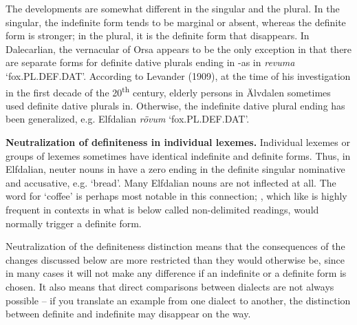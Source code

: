 
The developments are somewhat different in the singular and the plural. In the singular, the indefinite form tends to be marginal or absent, whereas the definite form is stronger; in the plural, it is the definite form that disappears. In Dalecarlian,  the vernacular of Orsa appears to be the only exception in that there are separate forms for definite dative plurals ending in \nobreakdash-as in \textit{revuma} ‘fox.PL.DEF.DAT’. According to Levander\textsc{ (1909)}, at the time of his investigation in the first decade of the 20\textsuperscript{th} century, elderly persons in Älvdalen sometimes used definite dative plurals in\textstyleLinguisticExample{ }.  Otherwise, the indefinite dative plural ending  has been generalized, e.g. Elfdalian \textit{rövum} ‘fox.PL.DEF.DAT’.


\textbf{Neutralization of definiteness in individual lexemes. }Individual lexemes or groups of lexemes sometimes have identical indefinite and definite forms. Thus, in Elfdalian, neuter nouns in have a zero ending in the definite singular nominative and accusative, e.g.  ‘bread’. Many Elfdalian nouns are not inflected at all.  The word for ‘coffee’ is perhaps most notable in this connection; , which like  is highly frequent in contexts in what is below called non-delimited readings, would normally trigger a definite form. 


Neutralization of the definiteness distinction means that the consequences of the changes discussed below are more restricted than they would otherwise be, since in many cases it will not make any difference if an indefinite or a definite form is chosen. It also means that direct comparisons between dialects are not always possible – if you translate an example from one dialect to another, the distinction between definite and indefinite may disappear on the way. 

